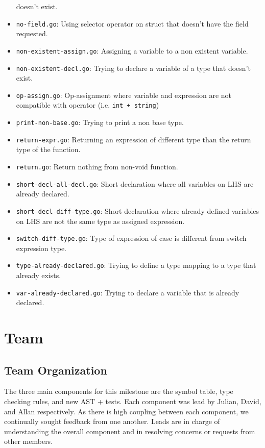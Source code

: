 \documentclass[11pt]{article}
\begin{document}
\begin{itemize}
doesn't exist.
\item \texttt{no-field.go}: Using selector operator on struct that doesn't have
the field requested.
\item \texttt{non-existent-assign.go}: Assigning a variable to a non existent
variable.
\item \texttt{non-existent-decl.go}: Trying to declare a variable of a type that
doesn't exist.
\item \texttt{op-assign.go}: Op-assignment where variable and expression are not
compatible with operator (i.e. \texttt{int + string})
\item \texttt{print-non-base.go}: Trying to print a non base type.
\item \texttt{return-expr.go}: Returning an expression of different type than the
return type of the function.
\item \texttt{return.go}: Return nothing from non-void function.
\item \texttt{short-decl-all-decl.go}: Short declaration where all variables on
LHS are already declared.
\item \texttt{short-decl-diff-type.go}: Short declaration where already defined
variables on LHS are not the same type as assigned expression.
\item \texttt{switch-diff-type.go}: Type of expression of case is different from
switch expression type.
\item \texttt{type-already-declared.go}: Trying to define a type mapping to a
type that already exists.
\item \texttt{var-already-declared.go}: Trying to declare a variable that is
already declared.
\end{itemize}
\section{Team}
\label{sec:org567a413}
\subsection{Team Organization}
\label{sec:orga773ebb}
The three main components for this milestone are the symbol table,
type checking rules, and new AST + tests.  Each component was lead
by Julian, David, and Allan respectively. As there is high coupling
between each component, we continually sought feedback from one
another. Leads are in charge of understanding the overall component
and in resolving concerns or requests from other members.
\end{document}
